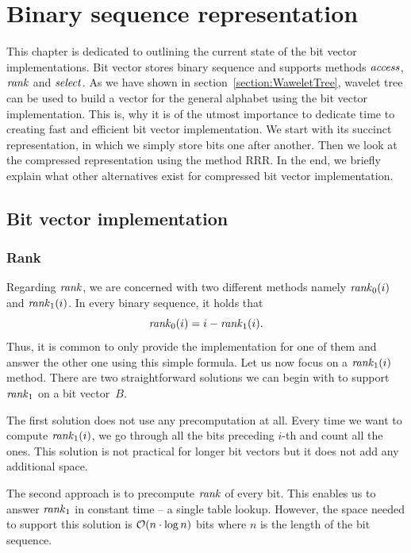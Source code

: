 \chapter{Binary sequence representation}
\label{kap:kap2}

This chapter is dedicated to outlining the current state of the bit vector
implementations. Bit vector stores binary sequence and supports methods $\mathit{access}$,
$\mathit{rank}$ and $\mathit{select}$. As we have shown in section~\ref{section:WaweletTree}, wavelet
tree can be used to build a vector for the general alphabet using the bit vector
implementation. This is, why it is of the utmost importance to dedicate time
to creating fast and efficient bit vector implementation. We start with its
succinct representation, in which we simply store bits one after another. Then we
look at the compressed representation using the method RRR. In the end, we briefly
explain what other alternatives exist for compressed bit vector implementation.

\section{Bit vector implementation}

\subsection{Rank}
\label{section:rank}

Regarding $\mathit{rank}$, we are concerned with two different methods namely $\mathit{rank}_0(i)$
and $\mathit{rank}_1(i)$. In every binary sequence, it holds that $$\mathit{rank}_0(i) = i - \mathit{rank}_1(i).$$
Thus, it is common to only provide
the implementation for one of them and answer the other one using this simple formula.
Let us now focus on a $\mathit{rank}_1(i)$ method. There are two
straightforward solutions we can begin with to support $\mathit{rank}_1$ on a bit vector~$B$.

The first solution does not use any precomputation at all. Every time we want
to compute $\mathit{rank}_1(i)$, we go through all the bits preceding $i$-th and count all
the ones. This solution is not practical for longer bit vectors but it does not
add any additional space.

The second approach is to precompute $\mathit{rank}$ of every bit. This enables us to answer
$\mathit{rank}_1$ in constant time -- a single table lookup. However, the space needed to
support this solution is $\mathcal{O}(n\cdot\log n)$ bits where $n$ is the length of the
bit sequence.

